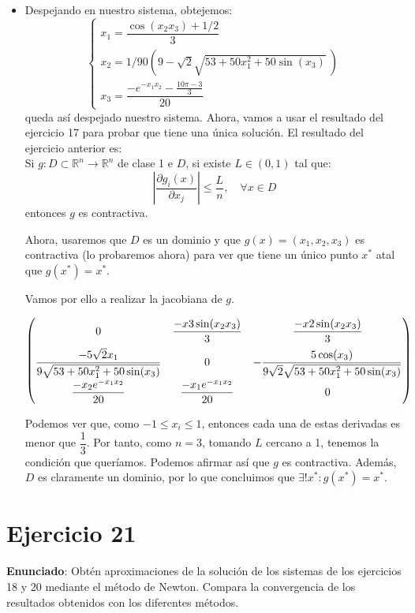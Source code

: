 \documentclass[11pt]{article}
\begin{document}
\begin{itemize}
	\item Despejando en nuestro sistema, obtejemos:
	\[
	\displaystyle\begin{cases}
	x_1 = \dfrac{\cos (x_2x_3) + 1/2}{3}\\
 x_2 = 1/90 (9 - \sqrt2 \sqrt{53 + 50 x_1^2 + 50 \sin (x_3)}\ )\\
  x_3 = \dfrac{-e^{-x_1x_2}- \frac{10\pi-3}{3}}{20}
\end{cases}
	\]
	queda así despejado nuestro sistema.
	Ahora, vamos a usar el resultado del ejercicio 17 para probar que tiene una única solución.
	El resultado del ejercicio anterior es:\\
	Si $g:D\subset \mathbb R^n \to \mathbb R^n$ de clase 1 e $D$, si existe $L \in (0,1)$ tal que:
	\[
	\left|\dfrac{\partial g_i(x)}{\partial x_j}\right| \leq \dfrac{L}{n}, \quad \forall x \in D
	\]
	entonces $g$ es contractiva.
	
	Ahora, usaremos que $D$ es un dominio y que $g(x) = (x_1,x_2,x_3)$ es contractiva (lo probaremos ahora) para ver que tiene un único punto $x^*$ atal que $g(x^*) = x^*$.
	
	Vamos por ello a realizar la jacobiana de $g$.
        
        \[
        \setlength{\delimitershortfall}{0pt}
        \begin{pmatrix}
    0 & \dfrac{-x3 \sin (x_2x_3)}{3} & \dfrac{-x2 \sin (x_2x_3)}{3}\\[2ex]
    
  \dfrac{-5 \sqrt2 x_1}{9 \sqrt{53 + 50 x_1^2 + 50 \sin (x_3)}}& 0  &  -\dfrac{5 \cos (x_3)}{9 \sqrt2 \sqrt{53 + 50 x_1^2 + 50 \sin(x_3)}} \\[2ex]
    
    \dfrac{-x_2e^{-x_1x_2}}{20} & 
    \dfrac{-x_1e^{-x_1x_2}}{20} & 0
  \end{pmatrix}
        \]
        

 Podemos ver que, como $-1 \leq x_i \leq 1$, entonces cada una de estas derivadas es menor que $\dfrac{1}{3}$. Por tanto, como $n=3$, tomando $L$ cercano a 1, tenemos la condición que queríamos. Podemos afirmar así que $g$ es contractiva. Además, $D$ es claramente un dominio, por lo que concluimos que $\exists ! x^* : g(x^*) = x^*$.
\end{itemize}

\section{Ejercicio 21}
\textbf{Enunciado}: Obtén aproximaciones de la solución de los sistemas de los ejercicios 18 y 20 mediante el método de Newton. Compara la convergencia de los resultados obtenidos con los diferentes métodos.
\end{document}
